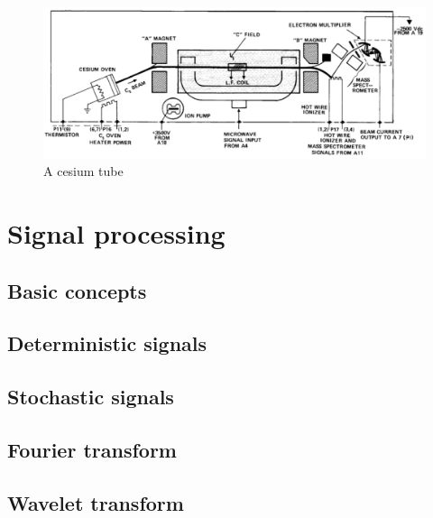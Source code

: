 \begin{figure}[htb] 
	\label{fig:atomic_tube}
	\centering
	\includegraphics[width=\textwidth]{figures/atomic_tube}
	\caption{A cesium tube}
\end{figure}


\section{Signal processing}
\subsection{Basic concepts}
\subsection{Deterministic signals}
\subsection{Stochastic signals}
\subsection{Fourier transform}
\subsection{Wavelet transform}


